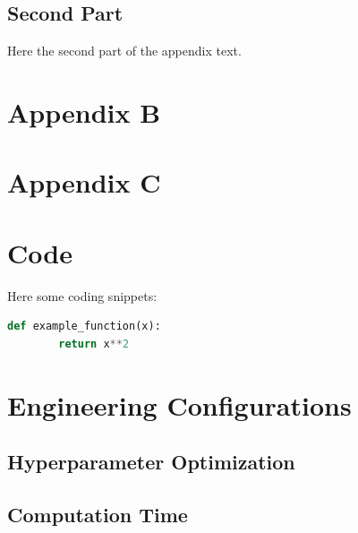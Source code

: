 \begin{appendix}
    \section{Second Part}
    Here the second part of the appendix text.

    \chapter{Appendix B}\label{anhang3}

    \chapter{Appendix C}\label{anhang4}

    \chapter{Code}\label{anhang5}
    Here some coding snippets:
    \begin{lstlisting}[language=Python, caption={Example Python Code}]
    def example_function(x):
        return x**2
    \end{lstlisting}

    \chapter{Engineering Configurations}\label{anhang6}
    \section{Hyperparameter Optimization}

    \section{Computation Time}

\end{appendix}